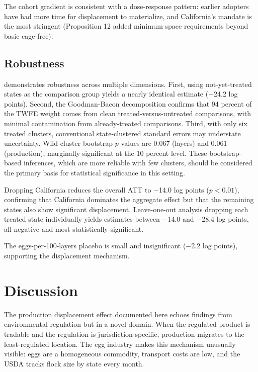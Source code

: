 \documentclass[12pt]{article}
\begin{document}
The cohort gradient is consistent with a dose-response pattern: earlier adopters have had more time for displacement to materialize, and California's mandate is the most stringent (Proposition 12 added minimum space requirements beyond basic cage-free).



\subsection{Robustness}

 demonstrates robustness across multiple dimensions. First, using not-yet-treated states as the comparison group yields a nearly identical estimate ($-$24.2 log points). Second, the Goodman-Bacon decomposition confirms that 94 percent of the TWFE weight comes from clean treated-versus-untreated comparisons, with minimal contamination from already-treated comparisons. Third, with only six treated clusters, conventional state-clustered standard errors may understate uncertainty. Wild cluster bootstrap $p$-values are 0.067 (layers) and 0.061 (production), marginally significant at the 10 percent level. These bootstrap-based inferences, which are more reliable with few clusters, should be considered the primary basis for statistical significance in this setting.

Dropping California reduces the overall ATT to $-$14.0 log points ($p < 0.01$), confirming that California dominates the aggregate effect but that the remaining states also show significant displacement. Leave-one-out analysis dropping each treated state individually yields estimates between $-$14.0 and $-$28.4 log points, all negative and most statistically significant.

The eggs-per-100-layers placebo is small and insignificant ($-$2.2 log points), supporting the displacement mechanism.




\section{Discussion}

The production displacement effect documented here echoes findings from environmental regulation \citep{levinson2008unmasking, walker2013transitional} but in a novel domain. When the regulated product is tradable and the regulation is jurisdiction-specific, production migrates to the least-regulated location. The egg industry makes this mechanism unusually visible: eggs are a homogeneous commodity, transport costs are low, and the USDA tracks flock size by state every month.
\end{document}
